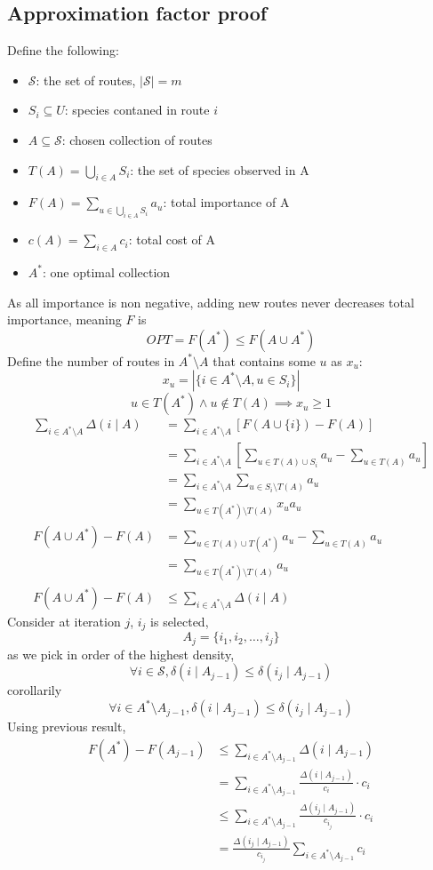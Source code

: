 \documentclass[10pt]{article}
\theoremstyle{definition}
\begin{document}
\subsection{Approximation factor proof}
Define the following:
\begin{itemize}
  \item $\mathcal{S}$: the set of routes, $|\mathcal{S}| = m$
  \item $S_i \subseteq U$: species contaned in route $i$
  \item $A \subseteq \mathcal{S}$: chosen collection of routes
  \item $T(A) = \bigcup_{i \in A} S_i$: the set of species observed in A
  \item $F(A) = \sum_{u \in \bigcup_{i \in A}S_i} a_u$: total importance of A
  \item $c(A) = \sum_{i \in A} c_i$: total cost of A
  \item $A^*$: one optimal collection
\end{itemize}
As all importance is non negative, adding new routes never decreases total importance, meaning $F$ is 
\[OPT = F(A^*) \leq F(A \cup A^*)\]
Define the number of routes in $A^* \setminus A$ that contains some $u$ as $x_u$:
\[x_u = |\{i \in A^* \setminus A, u \in S_i\}|\]
\[u \in T(A^*) \land u \notin T(A) \implies x_u \geq 1\]
\begin{align*}
\sum_{i \in A^* \setminus A} \Delta (i \mid A) &= \sum_{i \in A^* \setminus A} [F(A\cup \{i\}) - F(A)]  \\
&= \sum_{i \in A^* \setminus A} \left[ \sum_{u \in T(A) \cup S_i} a_u - \sum_{u \in T(A)} a_u \right]\\
&= \sum_{i \in A^* \setminus A} \sum_{u \in S_i \setminus T(A)} a_u\\
&= \sum_{u \in T(A^*) \setminus T(A)} x_u a_u\\
F(A\cup A^*) - F(A) &= \sum_{u \in T(A) \cup T(A^*)} a_u - \sum_{u \in T(A)} a_u\\
&= \sum_{u \in T(A^*) \setminus T(A)} a_u\\
F(A\cup A^*) - F(A) &\leq \sum_{i \in A^* \setminus A} \Delta (i \mid A)
\end{align*}
Consider at iteration $j$, $i_j$ is selected, 
\[A_j = \{i_1, i_2, \dots, i_j\}\]
as we pick in order of the highest density, 
\[\forall i \in \mathcal{S}, \delta(i \mid A_{j-1}) \leq \delta(i_j\mid A_{j-1}) \]
corollarily 
\[\forall i \in A^* \setminus A_{j-1}, \delta(i \mid A_{j-1}) \leq \delta(i_j\mid A_{j-1}) \]
Using previous result, 
\begin{align*}
  F(A^*) - F(A_{j-1}) &\leq \sum_{i \in A^* \setminus A_{j-1}} \Delta(i \mid A_{j-1})\\
  &= \sum_{i \in A^* \setminus A_{j-1}} \frac{\Delta(i \mid A_{j-1})}{c_i} \cdot c_i\\
  &\leq \sum_{i \in A^* \setminus A_{j-1}} \frac{\Delta(i_j \mid A_{j - 1})}{c_{i_j}} \cdot c_i\\
  &= \frac{\Delta(i_j \mid A_{j - 1})}{c_{i_j}} \sum_{i \in A^* \setminus A_{j-1}} c_i
\end{align*}
\end{document}
